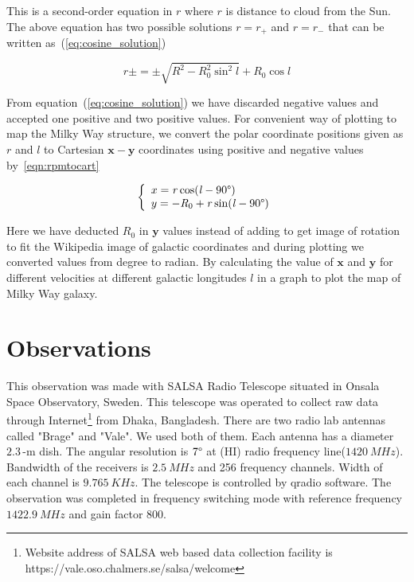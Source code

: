 \documentclass[conference]{IEEEtran}
\begin{document}
This is a second-order equation in $\mathit{r}$ where $\mathit{r}$ is distance to cloud from the Sun. The above equation has two possible solutions $\mathit{r}=\mathit{r}_{+}$ and $\mathit{r}=\mathit{r}_{-}$ that can be written as~(\ref{eq:cosine_solution})

\begin{equation}
 \mathit{r}\pm=\pm\sqrt{\mathit{R}^{2}-\mathit{R}_{0}^{2}\sin^{2} l}+\mathit{R}_{0}\cos l
 \label{eq:cosine_solution}
\end{equation}

From equation~(\ref{eq:cosine_solution}) we have discarded negative values and accepted one positive and two positive values. For convenient way of plotting to map the Milky Way structure, we convert the polar coordinate positions given as $\mathit{r}$ and $\mathit{l}$ to Cartesian $\mathbf{x-y}$ coordinates using positive and negative values by~\ref{eqn:rpmtocart}

\begin{equation}
\left\lbrace
\begin{array}{l}
	x=\mathit{r} \cos (\mathit{l}-90\degree) \\
	y=-\mathit{R}_{0}+\mathit{r} \sin (\mathit{l}-90\degree) \\
\end{array}
\right.
\label{eqn:rpmtocart}
\end{equation}

Here we have deducted $\mathit{R}_{0}$ in $\mathbf{y}$ values instead of adding to get image of rotation to fit the Wikipedia image of galactic coordinates and during plotting we converted values from degree to radian. By calculating the value of $\mathbf{x}$ and $\mathbf{y}$ for different velocities at different galactic longitudes $\mathit{l}$ in a graph to plot the map of Milky Way galaxy\cite{CathyHorellou2015,griffiths2016introduction}.

\section{Observations}

This observation was made with SALSA Radio Telescope situated in Onsala Space Observatory, Sweden. This telescope was operated to collect raw data through Internet\footnote{Website address of SALSA web based data collection facility is https://vale.oso.chalmers.se/salsa/welcome} from Dhaka, Bangladesh. There are two radio lab antennas called "Brage" and "Vale". We used both of them. Each antenna has a diameter $2.3$\,-m dish. The angular resolution is $7\degree$ at (HI) radio frequency line($\SI{1420}{MHz}$). Bandwidth of the receivers is $\SI{2.5}{MHz}$ and 256 frequency channels. Width of each channel is $\SI{9.765}{KHz}$. The telescope is controlled by qradio software. The observation was completed in frequency switching mode with reference frequency $\SI{1422.9}{MHz}$ and gain factor $800$\cite{CathyHorellou2015}.
\end{document}
